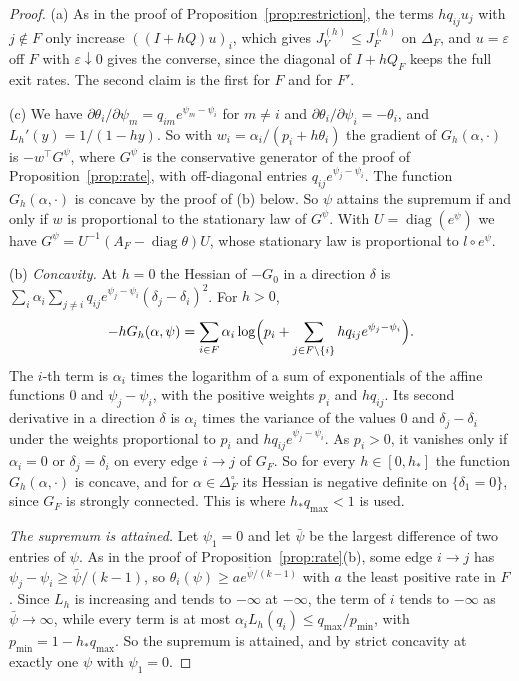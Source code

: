 \begin{proof}
(a) As in the proof of Proposition~\ref{prop:restriction}, the terms
$hq_{ij}u_j$ with $j\notin F$ only increase $((I+hQ)u)_i$, which gives
$J^{(h)}_V\le J^{(h)}_F$ on $\Delta_F$, and $u=\varepsilon$ off $F$ with
$\varepsilon\downarrow0$ gives the converse, since the diagonal of $I+hQ_F$ keeps
the full exit rates. The second claim is the first for $F$ and for $F'$.

(c) We have $\partial\theta_i/\partial\psi_m=q_{im}e^{\psi_m-\psi_i}$ for
$m\ne i$ and $\partial\theta_i/\partial\psi_i=-\theta_i$, and
$L_h'(y)=1/(1-hy)$. So with $w_i=\alpha_i/(p_i+h\theta_i)$ the gradient of
$G_h(\alpha,\cdot)$ is $-w^\top G^\psi$, where $G^\psi$ is the conservative
generator of the proof of Proposition~\ref{prop:rate}, with off-diagonal entries
$q_{ij}e^{\psi_j-\psi_i}$. The function $G_h(\alpha,\cdot)$ is concave by the
proof of (b) below. So $\psi$ attains the supremum if and only if $w$ is
proportional to the stationary law of $G^\psi$. With
$U=\operatorname{diag}(e^\psi)$ we have
$G^\psi=U^{-1}(A_F-\operatorname{diag}\theta)U$, whose stationary law is
proportional to $l\circ e^\psi$.

(b) \emph{Concavity.} At $h=0$ the Hessian of $-G_0$ in a direction $\delta$ is
$\sum_i\alpha_i\sum_{j\ne i}q_{ij}e^{\psi_j-\psi_i}(\delta_j-\delta_i)^2$. For
$h>0$,
\[
 -hG_h(\alpha,\psi)=\sum_{i\in F}\alpha_i
 \log\Bigl(p_i+\sum_{j\in F\setminus\{i\}}hq_{ij}e^{\psi_j-\psi_i}\Bigr).
\]
The $i$-th term is $\alpha_i$ times the logarithm of a sum of exponentials of
the affine functions $0$ and $\psi_j-\psi_i$, with the positive weights $p_i$ and
$hq_{ij}$. Its second derivative in a direction $\delta$ is $\alpha_i$ times the
variance of the values $0$ and $\delta_j-\delta_i$ under the weights
proportional to $p_i$ and $hq_{ij}e^{\psi_j-\psi_i}$. As $p_i>0$, it vanishes
only if $\alpha_i=0$ or $\delta_j=\delta_i$ on every edge $i\to j$ of $G_F$. So
for every $h\in[0,h_*]$ the function $G_h(\alpha,\cdot)$ is concave, and for
$\alpha\in\Delta_F^\circ$ its Hessian is negative definite on $\{\delta_1=0\}$,
since $G_F$ is strongly connected. This is where $h_*q_{\max}<1$ is used.

\emph{The supremum is attained.} Let $\psi_1=0$ and let $\bar\psi$ be the
largest difference of two entries of $\psi$. As in the proof of
Proposition~\ref{prop:rate}(b), some edge $i\to j$ has
$\psi_j-\psi_i\ge\bar\psi/(k-1)$, so $\theta_i(\psi)\ge ae^{\bar\psi/(k-1)}$ with
$a$ the least positive rate in $F$. Since $L_h$ is increasing and tends to
$-\infty$ at $-\infty$, the term of $i$ tends to $-\infty$ as $\bar\psi\to\infty$,
while every term is at most $\alpha_iL_h(q_i)\le q_{\max}/p_{\min}$, with
$p_{\min}=1-h_*q_{\max}$. So the supremum is attained, and by strict concavity at
exactly one $\psi$ with $\psi_1=0$.


\end{proof}
